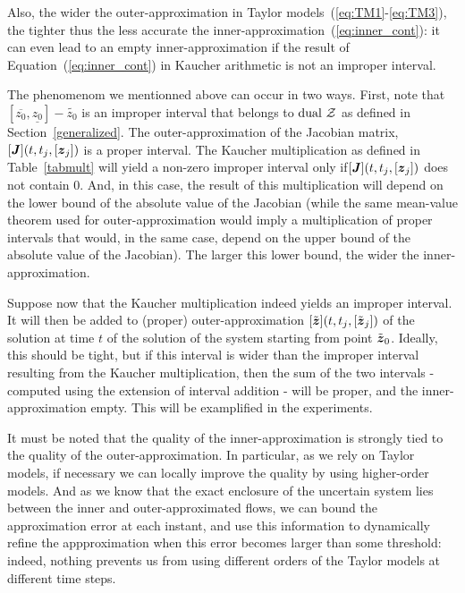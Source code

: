 \documentclass{sig-alternate-05-2015} %
\newcommand{\dual}{\mbox{dual }}
\begin{document}
Also, the wider the outer-approximation in Taylor models~(\ref{eq:TM1}-\ref{eq:TM3}), the tighter thus the less accurate the inner-approximation~(\ref{eq:inner_cont}): 
it can even  lead to an empty inner-approximation if the result of Equation~(\ref{eq:inner_cont}) in Kaucher arithmetic is not an improper interval. 

The phenomenom we mentionned above can occur in two ways. First, note that $[\overline{z_0},\underline{z_0}]-\tilde{z_0}$ is an improper interval that belongs to $\dual {\cal Z}$ as defined 
in Section~\ref{generalized}. The outer-approximation of the Jacobian matrix,  $[\J](t,t_j,[{\z}_j])$ is a proper interval. The Kaucher multiplication as defined in Table~\ref{tabmult}
will yield a non-zero improper interval only if$[\J](t,t_j,[{\z}_j])$ does not contain $0$. And, in this case, the result of this multiplication will depend on the 
lower bound of the absolute value of the Jacobian (while the same mean-value theorem used for outer-approximation would imply a multiplication of proper intervals that would, 
in the same case, depend on the upper bound of the absolute value of the Jacobian). The larger this lower bound, the wider the inner-approximation. 

Suppose now that the Kaucher multiplication indeed yields an improper interval. It will then be added to (proper) outer-approximation  $[\tilde{\z}](t,t_j,[\tilde{\z}_j])$ 
of the solution at time $t$ of the solution of the system starting from point $\tilde{\z}_0$. Ideally, this should be tight, but if this interval is wider than the improper 
interval resulting from the Kaucher multiplication, then the sum of the two intervals - computed using the extension of interval addition - will be proper, 
and the inner-approximation empty. This will be examplified in the experiments. 


It must be noted that the quality of the inner-approxima\-tion is strongly tied to the quality of the outer-approximation. 
In particular, as we rely on Taylor models, if necessary we can locally improve the quality by using higher-order models. 
And as we know that the exact enclosure of the uncertain system lies between the inner and outer-approximated flows, 
we can bound the approximation error at each instant, and use this information to dynamically refine the appproximation 
when this error becomes larger than some threshold: indeed, nothing prevents us from using different orders of the Taylor models 
at different time steps.  
\end{document}
